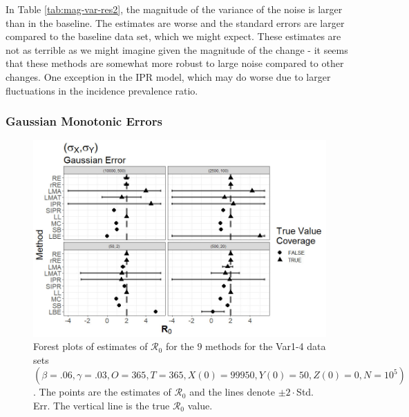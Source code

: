 \documentclass[12pt]{article}
\newcommand{\xxsir}{\ensuremath{9} } %
\newcommand{\rr}{\ensuremath{\mathcal{R}_0}}
\begin{document}
In Table \ref{tab:mag-var-res2}, the magnitude of the variance of the noise is larger than in the baseline. The estimates are worse and the standard errors are larger compared to the baseline data set, which we might expect. These estimates are not as terrible as we might imagine given the magnitude of the change - it seems that these methods are somewhat more robust to large noise compared to other changes. One exception in the IPR model, which may do worse due to larger fluctuations in the incidence prevalence ratio. 

\subsubsection{Gaussian Monotonic Errors}

\begin{figure}[H]
	\begin{center}
		\includegraphics[scale=0.5]{images/var_nm.jpg}
		\caption{Forest plots of estimates of $\rr$ for the \xxsir methods for the Var1-4 data sets $(\beta=.06, \gamma=.03, O=365, T=365, X(0)=99950, Y(0)=50, Z(0)=0, N=10^5)$.  The points are the estimates of $\rr$ and the lines denote $\pm 2\cdot $Std. Err.  The vertical line is the true $\rr$ value.}
	\end{center}
\end{figure}
\end{document}
